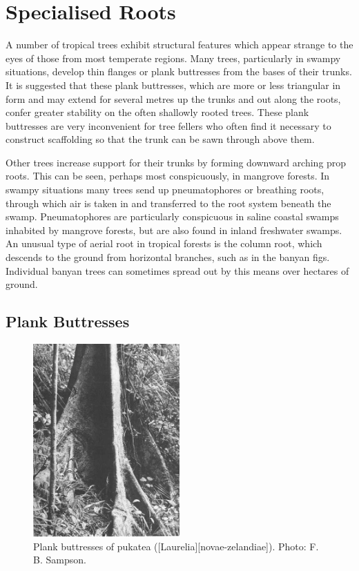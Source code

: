 \section{Specialised Roots}

A number of tropical trees exhibit structural features which appear strange to the eyes of those from most temperate regions.
Many trees, particularly in swampy situations, develop thin flanges or plank buttresses from the bases of their trunks.
It is suggested that these plank buttresses, which are more or less triangular in form and may extend for several metres up the trunks and out along the roots, confer greater stability on the often shallowly rooted trees.
These plank buttresses are very inconvenient for tree fellers who often find it necessary to construct scaffolding so that the trunk can be sawn through above them.

Other trees increase support for their trunks by forming downward arching prop roots.
This can be seen, perhaps most conspicuously, in mangrove forests.
In swampy situations many trees send up pneumatophores or breathing roots, through which air is taken in and transferred to the root system beneath the swamp.
Pneumatophores are particularly conspicuous in saline coastal swamps inhabited by mangrove forests, but are also found in inland freshwater swamps.
An unusual type of aerial root in tropical forests is the column root, which descends to the ground from horizontal branches, such as in the banyan figs.
Individual banyan trees can sometimes spread out by this means over hectares of ground.

\subsection{Plank Buttresses}

\begin{figure}
	\includegraphics[width=0.5\textwidth]{graphics/figure9buttresses.jpg}
	\centering
	\caption[Plank buttresses of pukatea]{Plank buttresses of pukatea ([Laurelia][novae-zelandiae]).
	Photo:  F. B. Sampson.}%
	\label{fig:9buttresses}
\end{figure}

